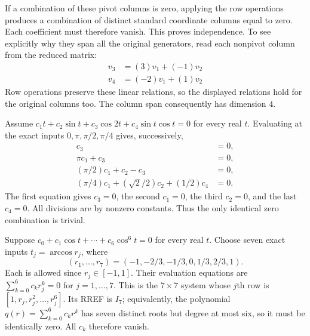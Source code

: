 If a combination of these pivot columns is zero, applying the row operations produces a combination of distinct standard coordinate columns equal to zero. Each coefficient must therefore vanish. This proves independence. To see explicitly why they span all the original generators, read each nonpivot column from the reduced matrix:
\[\begin{aligned}v_{3}&=(3)v_{1}+(-1)v_{2}\\v_{4}&=(-2)v_{1}+(1)v_{2}\end{aligned}\]
Row operations preserve these linear relations, so the displayed relations hold for the original columns too. The column span consequently has dimension $4$.


Assume $c_1t+c_2\sin t+c_3\cos2t+c_4\sin t\cos t=0$
for every real $t$. Evaluating at the exact inputs $0,\pi,\pi/2,\pi/4$
gives, successively,
\[
\begin{aligned}
c_3&=0,\\
\pi c_1+c_3&=0,\\
(\pi/2)c_1+c_2-c_3&=0,\\
(\pi/4)c_1+(\sqrt2/2)c_2+(1/2)c_4&=0.
\end{aligned}
\]
The first equation gives $c_3=0$, the second $c_1=0$, the third
$c_2=0$, and the last $c_4=0$. All divisions are by nonzero
constants. Thus the only identical zero combination is trivial.

Suppose $c_0+c_1\cos t+\cdots+c_6\cos^6t=0$ for every real $t$.
Choose seven exact inputs $t_j=\arccos r_j$, where
\[
(r_1,\ldots,r_7)=(-1,-2/3,-1/3,0,1/3,2/3,1).
\]
Each is allowed since $r_j\in[-1,1]$. Their evaluation equations are
$\sum_{k=0}^6 c_kr_j^k=0$ for $j=1,\ldots,7$.
This is the $7\times7$ system whose $j$th row is
$[1,r_j,r_j^2,\ldots,r_j^6]$. Its RREF is $I_7$; equivalently,
the polynomial $q(r)=\sum_{k=0}^6c_kr^k$ has seven distinct roots
but degree at most six, so it must be identically zero. All $c_k$
therefore vanish.
